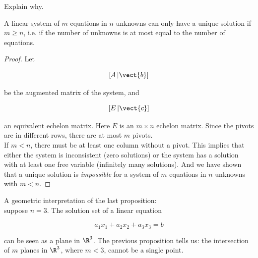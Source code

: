 \begin{exc}
\label{Exc:LinSystems:Check(In)Consistency}
Explain why.
\end{exc}

\begin{prop}
\label{Prop:LinSystems:UniqueSolutionImpliesSquareMatrix}
A linear system of $m$ equations in $n$ unknowns can only have a unique solution if $m \geq n$, i.e. if the number of unknowns is at most  equal to the number of equations.
\end{prop}

\begin{proof}
Let  

$$
 
[A\,|\vect{b}]
$$

be the augmented matrix of the system, and   

$$

 [E\,|\vect{c}]
 $$
 
an equivalent echelon matrix. Here  $E$ is an $m\times n$ echelon matrix. Since the pivots are in different rows, there are at most $m$ pivots. \\
If $m < n$, there must be at least one column without a pivot. This implies that either the system is inconsistent (zero solutions) or the system has a solution with at least one free variable (infinitely many solutions). And we have shown that a unique solution is \emph{impossible} for a system of $m$  equations in $n$ unknowns with $m < n$.
\end{proof}

\begin{rem}
\label{Rem:LinSystems:PlanesInSpace}
A geometric interpretation of the last proposition: \\
suppose $n = 3$. 
The solution set of a linear equation  

$$

 a_1x_1 + a_2x_2 + a_3x_3 = b
 $$

can be seen as  a plane in $\R^3$.  The previous proposition tells us:  the intersection of $m$ planes in $\R^3$, where $m < 3$, cannot be a single point.
\end{rem}

